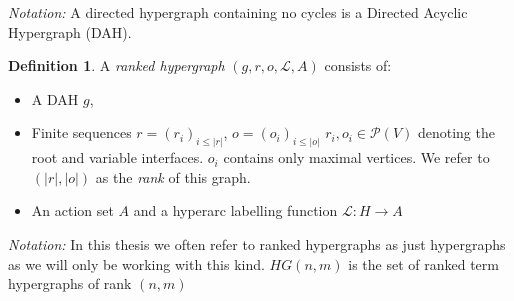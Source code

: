\documentclass[12pt]{article}
\theoremstyle{definition}
\newtheorem{definition}[theorem]{Definition}
\renewcommand{\P}{\mathcal{P}}
\newcommand{\1}{\mathbbm{1}}
\renewcommand{\L}{\mathcal{L}}
\begin{document}
\emph{Notation:} A directed hypergraph containing no cycles is a Directed Acyclic Hypergraph (DAH).

\begin{definition}
A \emph{ranked hypergraph} $(g, r, o, \L, A)$ consists of:
\begin{itemize}
\item A DAH $g$,
\item Finite sequences $r = (r_i)_{i\leq |r|}$, $o = (o_i)_{i\leq |o|}$ $r_i, o_i\in \P(V)$ denoting the root and variable interfaces. $o_i$ contains only maximal vertices. We refer to $(|r|, |o|)$ as the \emph{rank} of this graph.
\item An action set $A$ and a hyperarc labelling function $\L: H\to A$
\end{itemize}
\end{definition}
\emph{Notation:} In this thesis we often refer to ranked hypergraphs as just hypergraphs as we will only be working with this kind. $HG(n,m)$ is the set of ranked term hypergraphs of rank $(n,m)$
\end{document}
